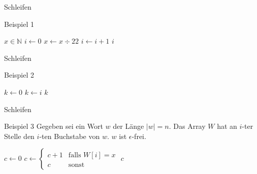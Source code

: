 \begin{frame}{Schleifen}
    \begin{exampleblock}{Beispiel 1}
        \begin{algorithm}
            \begin{algorithmic}
                \Require $x \in \mathbb{N}$
                \State $i \gets 0$
                    \State $x\gets x \div2 2$
                    \State $i\gets i + 1$
                \EndWhile
                \Ensure $i$
            \end{algorithmic}
        \end{algorithm}
    \end{exampleblock}
\end{frame}

\begin{frame}{Schleifen}
    \begin{exampleblock}{Beispiel 2}
        \begin{algorithm}
            \begin{algorithmic}
                \State $k \gets 0$
                    \State $k\gets i$
                \EndFor
                \Ensure $k$
            \end{algorithmic}
        \end{algorithm}
    \end{exampleblock}
\end{frame}

\begin{frame}{Schleifen}
    \begin{exampleblock}{Beispiel 3}
        Gegeben sei ein Wort $w$ der Länge $\left| w\right| = n$. Das Array $W$ hat an $i$-ter Stelle den $i$-ten Buchstabe von $w$. $w$ ist $\epsilon$-frei.
        \begin{algorithm}
            \begin{algorithmic}
                \State $c \gets 0$
                \State $c\gets \begin{cases} c + 1& \text{falls } W\left[ i\right] = x \\ c
                    &\text{sonst}\end{cases}$
                \EndFor
                \Ensure $c$
            \end{algorithmic}
        \end{algorithm}
    \end{exampleblock}
\end{frame}

